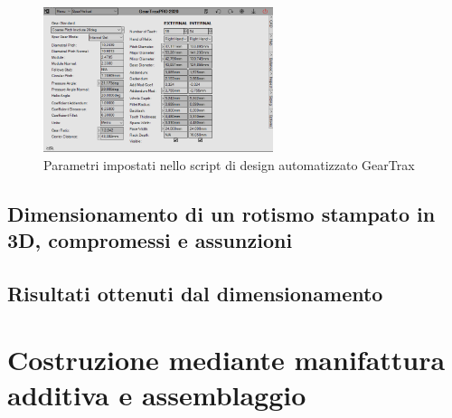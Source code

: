 \documentclass[%
corpo=11pt,
twoside,
 stile=classica,
oldstyle,
greek,%
]{toptesi}
\begin{document}
	\begin{figure}
		\centering
		\includegraphics[width=0.6\textwidth]{Plots/POLSO3/gear_polso3.png}
		\caption{Parametri impostati nello script di design automatizzato GearTrax}
		\label{fig:Gearpolso3}
	\end{figure} 
		
	
		
	

	\section{Dimensionamento di un rotismo stampato in 3D, compromessi e assunzioni}
	\section{Risultati ottenuti dal dimensionamento}
	

\chapter{Costruzione mediante manifattura additiva e assemblaggio}
\end{document}
